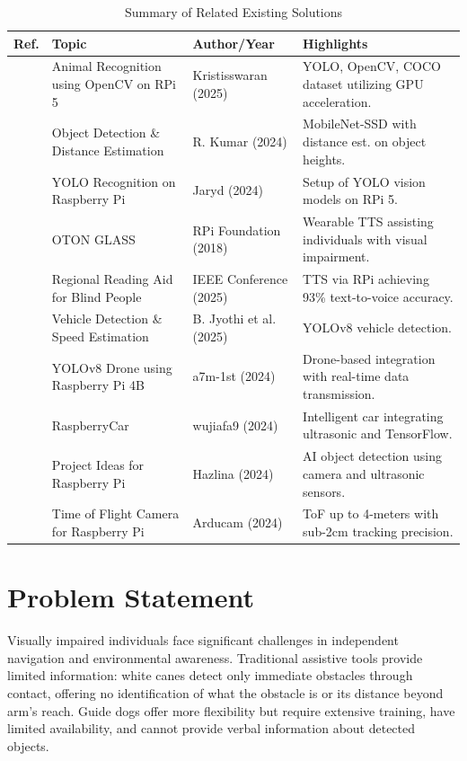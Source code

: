 \documentclass[conference]{IEEEtran}
\begin{document}
\begin{table}[htbp]
\caption{Summary of Related Existing Solutions}
\begin{center}
\begin{tabular}{|p{0.5cm}|p{2cm}|p{2cm}|p{2.5cm}|}
\hline
\textbf{Ref.} & \textbf{Topic} & \textbf{Author/Year} & \textbf{Highlights} \\
\hline
\cite{b3} & Animal Recognition using OpenCV on RPi 5 & Kristisswaran (2025) & YOLO, OpenCV, COCO dataset utilizing GPU acceleration. \\
\hline
\cite{b5} & Object Detection \& Distance Estimation & R. Kumar (2024) & MobileNet-SSD with distance est. on object heights. \\
\hline
\cite{b8} & YOLO Recognition on Raspberry Pi & Jaryd (2024) & Setup of YOLO vision models on RPi 5. \\
\hline
\cite{b4} & OTON GLASS & RPi Foundation (2018) & Wearable TTS assisting individuals with visual impairment. \\
\hline
\cite{b9} & Regional Reading Aid for Blind People & IEEE Conference (2025) & TTS via RPi achieving 93\% text-to-voice accuracy. \\
\hline
\cite{b10} & Vehicle Detection \& Speed Estimation & B. Jyothi et al. (2025) & YOLOv8 vehicle detection. \\
\hline
\cite{b1} & YOLOv8 Drone using Raspberry Pi 4B & a7m-1st (2024) & Drone-based integration with real-time data transmission. \\
\hline
\cite{b2} & RaspberryCar & wujiafa9 (2024) & Intelligent car integrating ultrasonic and TensorFlow. \\
\hline
\cite{b7} & Project Ideas for Raspberry Pi & Hazlina (2024) & AI object detection using camera and ultrasonic sensors. \\
\hline
\cite{b6} & Time of Flight Camera for Raspberry Pi & Arducam (2024) & ToF up to 4-meters with sub-2cm tracking precision. \\
\hline
\end{tabular}
\label{tab1}
\end{center}
\end{table}

\section{Problem Statement}
Visually impaired individuals face significant challenges in independent navigation and environmental awareness. Traditional assistive tools provide limited information: white canes detect only immediate obstacles through contact, offering no identification of what the obstacle is or its distance beyond arm's reach. Guide dogs offer more flexibility but require extensive training, have limited availability, and cannot provide verbal information about detected objects.
\end{document}
